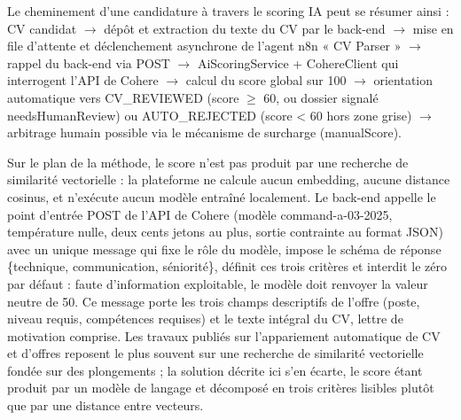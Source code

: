 Le cheminement d’une candidature à travers le scoring IA peut se résumer ainsi : CV candidat $\rightarrow$ dépôt et extraction du texte du CV par le back-end $\rightarrow$ mise en file d’attente et déclenchement asynchrone de l’agent n8n « CV Parser » $\rightarrow$ rappel du back-end via POST  $\rightarrow$ Ai\-Scoring\-Service + CohereClient qui interrogent l’API de Cohere $\rightarrow$ calcul du score global sur 100 $\rightarrow$ orientation automatique vers CV\_REVIEWED (score $\geq$ 60, ou dossier signalé needs\-Human\-Review) ou AUTO\_REJECTED (score < 60 hors zone grise) $\rightarrow$ arbitrage humain possible via le mécanisme de surcharge (manualScore).

Sur le plan de la méthode, le score n’est pas produit par une recherche de similarité vectorielle : la plateforme ne calcule aucun embedding, aucune distance cosinus, et n’exécute aucun modèle entraîné localement. Le back-end appelle le point d’entrée POST  de l’API de Cohere (modèle command-a-03-2025, température nulle, deux cents jetons au plus, sortie contrainte au format JSON) avec un unique message qui fixe le rôle du modèle, impose le schéma de réponse \{technique, communication, séniorité\}, définit ces trois critères et interdit le zéro par défaut : faute d’information exploitable, le modèle doit renvoyer la valeur neutre de 50. Ce message porte les trois champs descriptifs de l’offre (poste, niveau requis, compétences requises) et le texte intégral du CV, lettre de motivation comprise. Les travaux publiés sur l’appariement automatique de CV et d’offres reposent le plus souvent sur une recherche de similarité vectorielle fondée sur des plongements \cite{ref22} ; la solution décrite ici s’en écarte, le score étant produit par un modèle de langage et décomposé en trois critères lisibles plutôt que par une distance entre vecteurs.


